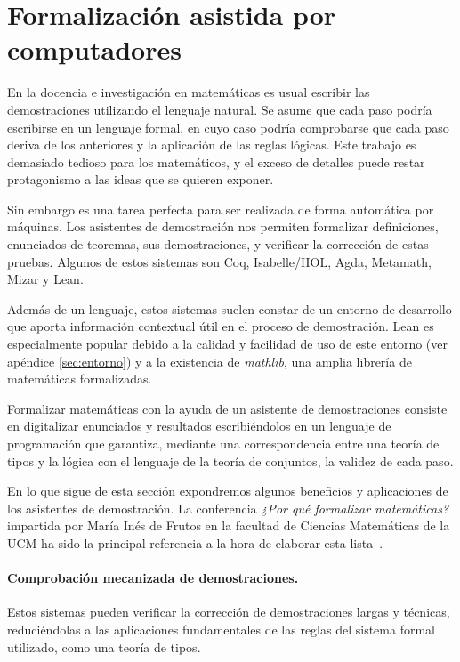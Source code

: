 \section{Formalización asistida por computadores}

En la docencia e investigación en matemáticas es usual escribir las
demostraciones utilizando el lenguaje natural. Se asume que cada paso podría
escribirse en un lenguaje formal, en cuyo caso podría comprobarse que cada paso
deriva de los anteriores y la aplicación de las reglas lógicas. Este trabajo es
demasiado tedioso para los matemáticos, y el exceso de detalles puede restar
protagonismo a las ideas que se quieren exponer.

Sin embargo es una tarea perfecta para ser realizada de forma automática
por máquinas. Los asistentes de demostración nos permiten formalizar
definiciones, enunciados de teoremas, sus demostraciones, y verificar la
corrección de estas pruebas. Algunos de estos sistemas son Coq,
Isabelle/HOL, Agda, Metamath, Mizar y Lean.

Además de un lenguaje, estos sistemas suelen constar de un entorno de desarrollo
que aporta información contextual útil en el proceso de demostración. Lean es
especialmente popular debido a la calidad y facilidad de uso de este entorno
(ver apéndice \ref{sec:entorno}) y a la existencia de \textit{mathlib}, una
amplia librería de matemáticas formalizadas.

Formalizar matemáticas con la ayuda de un asistente de demostraciones consiste
en digitalizar enunciados y resultados escribiéndolos en un lenguaje de
programación que garantiza, mediante una correspondencia entre una teoría de
tipos y la lógica con el lenguaje de la teoría de conjuntos, la validez de cada
paso.

En lo que sigue de esta sección expondremos algunos beneficios y aplicaciones
de los asistentes de demostración. La conferencia \textit{¿Por qué formalizar
	matemáticas?} impartida por María Inés de Frutos en la facultad de
Ciencias Matemáticas de la UCM ha sido la principal referencia a la hora de
elaborar esta lista~\cite{defrutosPorQueFormalizar2023a}.

\paragraph{Comprobación mecanizada de demostraciones.}

Estos sistemas pueden verificar la corrección de demostraciones largas y
técnicas, reduciéndolas a las aplicaciones fundamentales de las reglas del
sistema formal utilizado, como una teoría de tipos.

